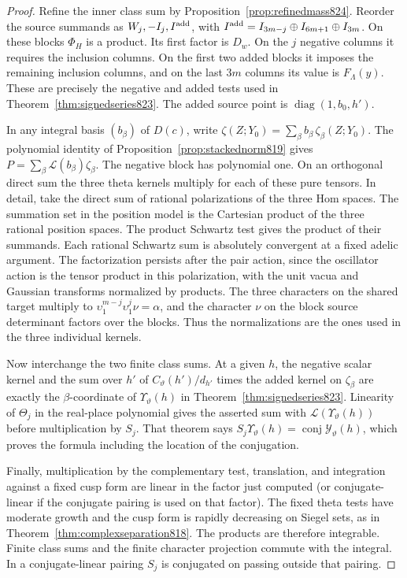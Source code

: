 \documentclass[a4paper,11pt]{article}
\theoremstyle{definition}
\theoremstyle{remark}
\numberwithin{equation}{section}
\begin{document}
\begin{proof}
Refine the inner class sum by
Proposition~\ref{prop:refinedmass824}. Reorder the source summands
as \(W_j,-I_j,I^{\rm add}\), with
\(I^{\rm add}=I_{3m-j}\oplus I_{6m+1}\oplus I_{3m}\).
On these blocks \(\Phi_H\) is a product. Its first factor is
\(D_w\). On the \(j\) negative columns it requires the
inclusion columns. On the first two added blocks it imposes
the remaining inclusion columns, and on the last \(3m\)
columns its value is \(F_\Lambda(y)\). These are precisely
the negative and added tests used in
Theorem~\ref{thm:signedseries823}. The added source point is
\(\operatorname{diag}(1,b_0,h')\).

In any integral basis \((b_\beta)\) of \(D(c)\), write
\(\zeta(Z;Y_0)=\sum_\beta b_\beta\,\zeta_\beta(Z;Y_0)\).
The polynomial identity of Proposition~\ref{prop:stackednorm819}
gives \(P=\sum_\beta\mathcal L(b_\beta)\zeta_\beta\).
The negative block has polynomial one. On an orthogonal
direct sum the three theta kernels multiply for each of these
pure tensors. In detail, take the direct sum of rational
polarizations of the three Hom spaces. The summation set in
the position model is the Cartesian product of the three
rational position spaces. The product Schwartz test gives
the product of their summands. Each rational Schwartz sum is
absolutely convergent at a fixed adelic argument. The
factorization persists after the pair action, since the
oscillator action is the tensor product in this polarization,
with the unit vacua and Gaussian transforms normalized by
products. The three characters on the shared target multiply
to \(\upsilon_1^{m-j}\upsilon_1^j\nu=\alpha\), and the
character \(\nu\) on the block source determinant factors over
the blocks. Thus the normalizations are the ones used in the
three individual kernels.

Now interchange the two finite class sums. At a given \(h\),
the negative scalar kernel and the sum over \(h'\) of
\(C_\vartheta(h')/d_{h'}\) times the added kernel on
\(\zeta_\beta\) are exactly the \(\beta\)-coordinate of
\(\Upsilon_\vartheta(h)\) in Theorem~\ref{thm:signedseries823}.
Linearity of \(\Theta_j\) in the real-place polynomial gives
the asserted sum with \(\mathcal L(\Upsilon_\vartheta(h))\)
before multiplication by \(S_j\). That theorem says
\(S_j\Upsilon_\vartheta(h)=\operatorname{conj}\mathcal Y_\vartheta(h)\),
which proves the formula including the location of the conjugation.

Finally, multiplication by the complementary test, translation,
and integration against a fixed cusp form are linear in the
factor just computed (or conjugate-linear if the conjugate
pairing is used on that factor). The fixed theta tests have
moderate growth and the cusp form is rapidly decreasing on
Siegel sets, as in Theorem~\ref{thm:complexseparation818}.
The products are therefore integrable. Finite class sums
and the finite character projection commute with the integral.
In a conjugate-linear pairing \(S_j\) is conjugated on passing
outside that pairing.
\end{proof}
\end{document}

